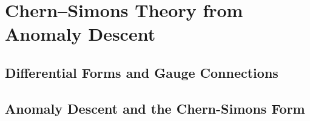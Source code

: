 %
%
%

\section{Chern--Simons Theory from Anomaly Descent}



\subsection{Differential Forms and Gauge Connections}


\subsection{Anomaly Descent and the Chern-Simons Form}


